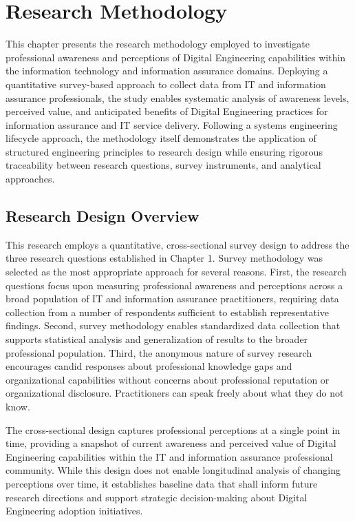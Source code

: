 \chapter{\leavevmode\newline Research Methodology}\label{chap:Chapter_3}



This chapter presents the research methodology employed to investigate professional awareness and perceptions of Digital Engineering capabilities within the information technology and information assurance domains. Deploying a quantitative survey-based approach to collect data from IT and information assurance professionals, the study enables systematic analysis of awareness levels, perceived value, and anticipated benefits of Digital Engineering practices for information assurance and IT service delivery. Following a systems engineering lifecycle approach, the methodology itself demonstrates the application of structured engineering principles to research design while ensuring rigorous traceability between research questions, survey instruments, and analytical approaches.

\section{Research Design Overview}

This research employs a quantitative, cross-sectional survey design to address the three research questions established in Chapter 1. Survey methodology was selected as the most appropriate approach for several reasons. First, the research questions focus upon measuring professional awareness and perceptions across a broad population of IT and information assurance practitioners, requiring data collection from a number of respondents sufficient to establish representative findings. Second, survey methodology enables standardized data collection that supports statistical analysis and generalization of results to the broader professional population. Third, the anonymous nature of survey research encourages candid responses about professional knowledge gaps and organizational capabilities without concerns about professional reputation or organizational disclosure. Practitioners can speak freely about what they do not know.

The cross-sectional design captures professional perceptions at a single point in time, providing a snapshot of current awareness and perceived value of Digital Engineering capabilities within the IT and information assurance professional community. While this design does not enable longitudinal analysis of changing perceptions over time, it establishes baseline data that shall inform future research directions and support strategic decision-making about Digital Engineering adoption initiatives.

